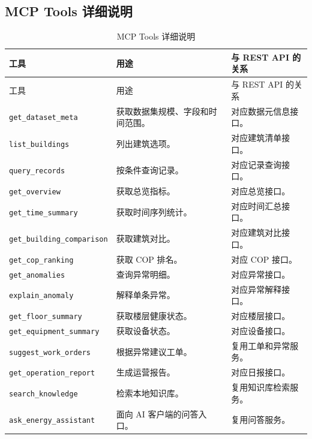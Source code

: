 \documentclass[12pt,a4paper]{ctexart}
\newcommand{\code}[1]{{\footnotesize\nolinkurl{#1}}}
\begin{document}
\subsection{MCP Tools 详细说明}
\begin{longtable}{L{4.0cm}L{5.4cm}L{5.0cm}}
\caption{MCP Tools 详细说明}\\
\toprule
工具 & 用途 & 与 REST API 的关系 \\
\midrule
\endfirsthead
\toprule
工具 & 用途 & 与 REST API 的关系 \\
\midrule
\endhead
\code{get_dataset_meta} & 获取数据集规模、字段和时间范围。 & 对应数据元信息接口。 \\
\code{list_buildings} & 列出建筑选项。 & 对应建筑清单接口。 \\
\code{query_records} & 按条件查询记录。 & 对应记录查询接口。 \\
\code{get_overview} & 获取总览指标。 & 对应总览接口。 \\
\code{get_time_summary} & 获取时间序列统计。 & 对应时间汇总接口。 \\
\code{get_building_comparison} & 获取建筑对比。 & 对应建筑对比接口。 \\
\code{get_cop_ranking} & 获取 COP 排名。 & 对应 COP 接口。 \\
\code{get_anomalies} & 查询异常明细。 & 对应异常接口。 \\
\code{explain_anomaly} & 解释单条异常。 & 对应异常解释接口。 \\
\code{get_floor_summary} & 获取楼层健康状态。 & 对应楼层接口。 \\
\code{get_equipment_summary} & 获取设备状态。 & 对应设备接口。 \\
\code{suggest_work_orders} & 根据异常建议工单。 & 复用工单和异常服务。 \\
\code{get_operation_report} & 生成运营报告。 & 对应日报接口。 \\
\code{search_knowledge} & 检索本地知识库。 & 复用知识库检索服务。 \\
\code{ask_energy_assistant} & 面向 AI 客户端的问答入口。 & 复用问答服务。 \\
\bottomrule
\end{longtable}
\end{document}
